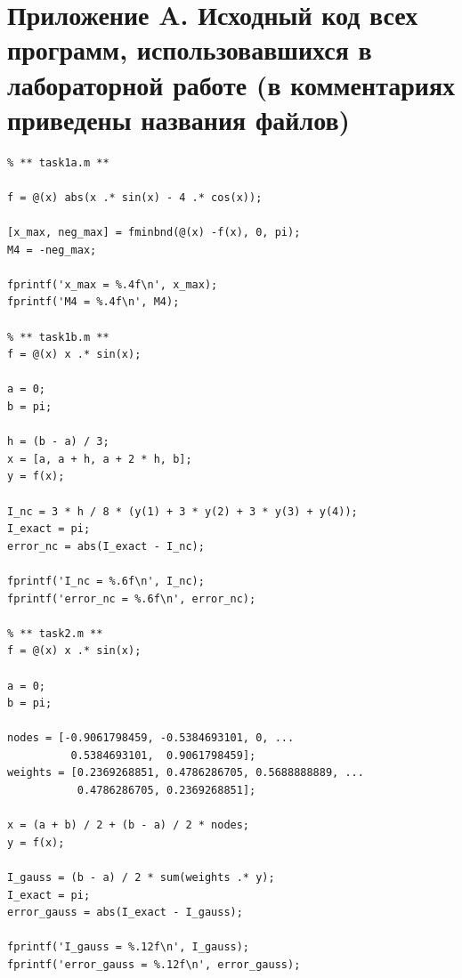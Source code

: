 \section*{Приложение A. Исходный код всех программ, использовавшихся в лабораторной работе (в комментариях приведены названия файлов)}

\renewcommand{\theFancyVerbLine}{%
    \scriptsize\ttfamily\textcolor{gray}{\arabic{FancyVerbLine}}%
}

\begin{verbatim}
% ** task1a.m **

f = @(x) abs(x .* sin(x) - 4 .* cos(x));

[x_max, neg_max] = fminbnd(@(x) -f(x), 0, pi);
M4 = -neg_max;

fprintf('x_max = %.4f\n', x_max);
fprintf('M4 = %.4f\n', M4);

% ** task1b.m **
f = @(x) x .* sin(x);

a = 0;
b = pi;

h = (b - a) / 3;
x = [a, a + h, a + 2 * h, b];
y = f(x);

I_nc = 3 * h / 8 * (y(1) + 3 * y(2) + 3 * y(3) + y(4));
I_exact = pi;
error_nc = abs(I_exact - I_nc);

fprintf('I_nc = %.6f\n', I_nc);
fprintf('error_nc = %.6f\n', error_nc);

% ** task2.m **
f = @(x) x .* sin(x);

a = 0;
b = pi;

nodes = [-0.9061798459, -0.5384693101, 0, ...
          0.5384693101,  0.9061798459];
weights = [0.2369268851, 0.4786286705, 0.5688888889, ...
           0.4786286705, 0.2369268851];

x = (a + b) / 2 + (b - a) / 2 * nodes;
y = f(x);

I_gauss = (b - a) / 2 * sum(weights .* y);
I_exact = pi;
error_gauss = abs(I_exact - I_gauss);

fprintf('I_gauss = %.12f\n', I_gauss);
fprintf('error_gauss = %.12f\n', error_gauss);
\end{verbatim}
